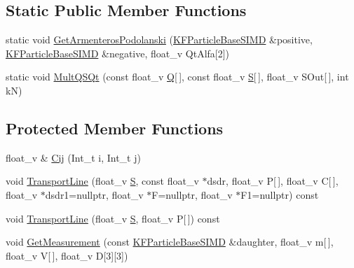 \subsection*{Static Public Member Functions}
\begin{DoxyCompactItemize}
\item 
static void \hyperlink{classKFParticleBaseSIMD_a2ddfa6bbbd4b147886b484d88b5d0e07}{Get\+Armenteros\+Podolanski} (\hyperlink{classKFParticleBaseSIMD}{K\+F\+Particle\+Base\+S\+I\+MD} \&positive, \hyperlink{classKFParticleBaseSIMD}{K\+F\+Particle\+Base\+S\+I\+MD} \&negative, float\+\_\+v Qt\+Alfa\mbox{[}2\mbox{]})
\item 
static void \hyperlink{classKFParticleBaseSIMD_a1339b5e3c8989903017e88a267fd5da3}{Mult\+Q\+S\+Qt} (const float\+\_\+v \hyperlink{classKFParticleBaseSIMD_a4627da237cb56fc359e983cf697741c0}{Q}\mbox{[}$\,$\mbox{]}, const float\+\_\+v \hyperlink{classKFParticleBaseSIMD_a906019dfd64d4209f9734506b195f9ed}{S}\mbox{[}$\,$\mbox{]}, float\+\_\+v S\+Out\mbox{[}$\,$\mbox{]}, int kN)
\end{DoxyCompactItemize}
\subsection*{Protected Member Functions}
\begin{DoxyCompactItemize}
\item 
float\+\_\+v \& \hyperlink{classKFParticleBaseSIMD_accd0d91999cad3409e82272a976cc878}{Cij} (Int\+\_\+t i, Int\+\_\+t j)
\item 
void \hyperlink{classKFParticleBaseSIMD_a22e86d6a0599f96326ea022bc8e84deb}{Transport\+Line} (float\+\_\+v \hyperlink{classKFParticleBaseSIMD_a906019dfd64d4209f9734506b195f9ed}{S}, const float\+\_\+v $\ast$dsdr, float\+\_\+v P\mbox{[}$\,$\mbox{]}, float\+\_\+v C\mbox{[}$\,$\mbox{]}, float\+\_\+v $\ast$dsdr1=nullptr, float\+\_\+v $\ast$F=nullptr, float\+\_\+v $\ast$F1=nullptr) const 
\item 
void \hyperlink{classKFParticleBaseSIMD_ab95a02fa9f64b2a299986623aae3e09b}{Transport\+Line} (float\+\_\+v \hyperlink{classKFParticleBaseSIMD_a906019dfd64d4209f9734506b195f9ed}{S}, float\+\_\+v P\mbox{[}$\,$\mbox{]}) const 
\item 
void \hyperlink{classKFParticleBaseSIMD_abead77d712c9ce7ed12bd925c5fb3d8b}{Get\+Measurement} (const \hyperlink{classKFParticleBaseSIMD}{K\+F\+Particle\+Base\+S\+I\+MD} \&daughter, float\+\_\+v m\mbox{[}$\,$\mbox{]}, float\+\_\+v V\mbox{[}$\,$\mbox{]}, float\+\_\+v D\mbox{[}3\mbox{]}\mbox{[}3\mbox{]})
\end{DoxyCompactItemize}
